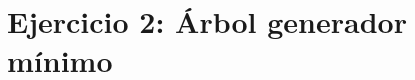 \documentclass[../main.tex]{subfiles}
\begin{document}
\section{Ejercicio 2: Árbol generador mínimo}
\label{sec:ej2}
\end{document}
